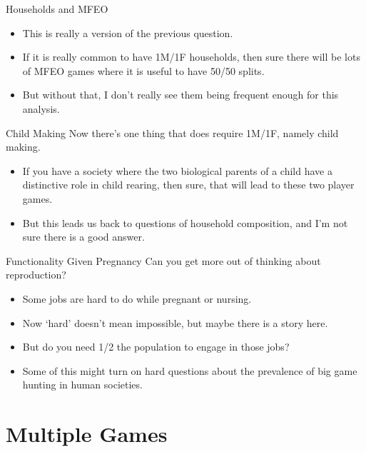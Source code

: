 \documentclass[
  ignorenonframetext,
]{beamer}
\providecommand{\tightlist}{%
  \setlength{\itemsep}{0pt}\setlength{\parskip}{0pt}}
\begin{document}
\begin{frame}{Households and MFEO}
\protect\hypertarget{households-and-mfeo}{}
\begin{itemize}
\tightlist
\item
  This is really a version of the previous question.
\item
  If it is really common to have 1M/1F households, then sure there will
  be lots of MFEO games where it is useful to have 50/50 splits.
\item
  But without that, I don't really see them being frequent enough for
  this analysis.
\end{itemize}
\end{frame}

\begin{frame}{Child Making}
\protect\hypertarget{child-making}{}
Now there's one thing that does require 1M/1F, namely child making.

\begin{itemize}
\tightlist
\item
  If you have a society where the two biological parents of a child have
  a distinctive role in child rearing, then sure, that will lead to
  these two player games.
\item
  But this leads us back to questions of household composition, and I'm
  not sure there is a good answer.
\end{itemize}
\end{frame}

\begin{frame}{Functionality Given Pregnancy}
\protect\hypertarget{functionality-given-pregnancy}{}
Can you get more out of thinking about reproduction?

\begin{itemize}
\tightlist
\item
  Some jobs are hard to do while pregnant or nursing.
\item
  Now `hard' doesn't mean impossible, but maybe there is a story here.
\item
  But do you need 1/2 the population to engage in those jobs?
\item
  Some of this might turn on hard questions about the prevalence of big
  game hunting in human societies.
\end{itemize}
\end{frame}

\hypertarget{multiple-games}{%
\section{Multiple Games}\label{multiple-games}}
\end{document}
